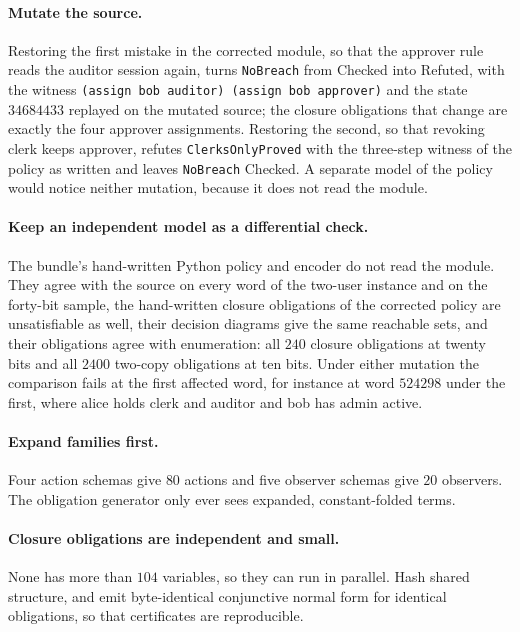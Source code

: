 \documentclass[11pt]{article}
\newcommand{\code}[1]{\texttt{#1}}
\theoremstyle{definition}
\theoremstyle{plain}
\begin{document}
\paragraph{Mutate the source.} Restoring the first mistake in the corrected module, so that the
approver rule reads the auditor session again, turns \code{NoBreach} from Checked into Refuted, with
the witness \code{(assign bob auditor) (assign bob approver)} and the state $34684433$ replayed on
the mutated source; the closure obligations that change are exactly the four approver assignments.
Restoring the second, so that revoking clerk keeps approver, refutes \code{ClerksOnlyProved} with the
three-step witness of the policy as written and leaves \code{NoBreach} Checked. A separate model of
the policy would notice neither mutation, because it does not read the module.

\paragraph{Keep an independent model as a differential check.} The bundle's hand-written Python
policy and encoder do not read the module. They agree with the source on every word of the two-user
instance and on the forty-bit sample, the hand-written closure obligations of the corrected policy
are unsatisfiable as well, their decision diagrams give the same reachable sets, and their
obligations agree with enumeration: all $240$ closure obligations at twenty bits and all $2400$
two-copy obligations at ten bits. Under either mutation the comparison fails at the first
affected word, for instance at word $524298$ under the first, where alice holds clerk and auditor and
bob has admin active.

\paragraph{Expand families first.} Four action schemas give $80$ actions and five observer schemas
give $20$ observers. The obligation generator only ever sees expanded, constant-folded terms.

\paragraph{Closure obligations are independent and small.} None has more than $104$ variables, so
they can run in parallel. Hash shared structure, and emit byte-identical conjunctive normal form for
identical obligations, so that certificates are reproducible.
\end{document}
